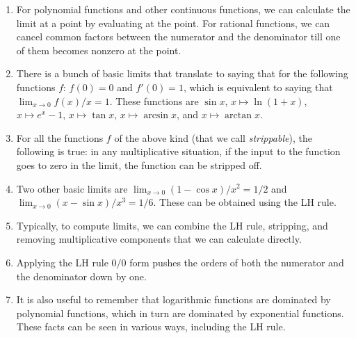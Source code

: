 \documentclass[10pt]{amsart}
\begin{document}
\begin{enumerate}
\item For polynomial functions and other continuous functions, we can
  calculate the limit at a point by evaluating at the point. For
  rational functions, we can cancel common factors between the
  numerator and the denominator till one of them becomes nonzero at
  the point.
\item There is a bunch of basic limits that translate to saying that
  for the following functions $f$: $f(0) = 0$ and $f'(0) = 1$, which
  is equivalent to saying that $\lim_{x \to 0} f(x)/x = 1$. These
  functions are $\sin x$, $x \mapsto \ln(1 + x)$, $x \mapsto e^x - 1$,
  $x \mapsto \tan x$, $x \mapsto \arcsin x$, and $x \mapsto \arctan
  x$.
\item For all the functions $f$ of the above kind (that we call {\em
  strippable}), the following is true: in any multiplicative
  situation, if the input to the function goes to zero in the limit,
  the function can be stripped off.
\item Two other basic limits are $\lim_{x \to 0} (1 - \cos x)/x^2 =
  1/2$ and $\lim_{x \to 0} (x - \sin x)/x^3 = 1/6$. These can be
  obtained using the LH rule.
\item Typically, to compute limits, we can combine the LH rule,
  stripping, and removing multiplicative components that we can
  calculate directly.
\item Applying the LH rule $0/0$ form pushes the orders of both the
  numerator and the denominator down by one.
\item It is also useful to remember that logarithmic functions are
  dominated by polynomial functions, which in turn are dominated by
  exponential functions. These facts can be seen in various ways,
  including the LH rule.
\end{enumerate}
\end{document}
